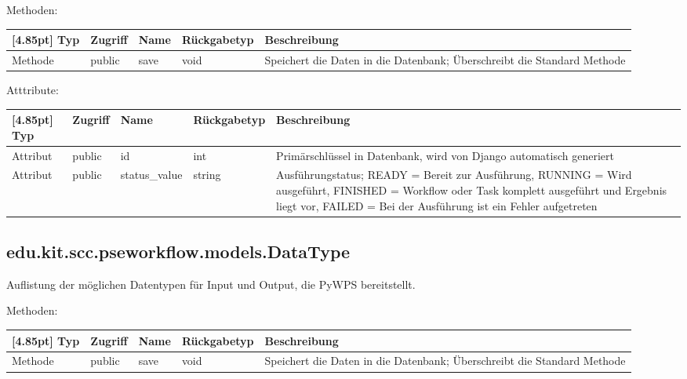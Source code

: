 			Methoden:
			\begin{center}
				\setlength\tabcolsep{5pt}
				\renewcommand{\arraystretch}{1.5}
				
				\begin{tabularx}{\textwidth}{|l|l|l|l|X|}
					\hline
					\rowcolor[gray]{0.75}[4.85pt]
					Typ & Zugriff & Name & Rückgabetyp & Beschreibung \\ \hline 
					Methode & public & save & void & Speichert die Daten in die Datenbank; Überschreibt die Standard Methode \\ 
					\hline
				\end{tabularx}
			\end{center}
			
			Atttribute:
			\begin{center}
				\setlength\tabcolsep{5pt}
				\renewcommand{\arraystretch}{1.5}
				
				\begin{tabularx}{\textwidth}{|l|l|l|l|X|}
					\hline
					\rowcolor[gray]{0.75}[4.85pt]
					Typ & Zugriff & Name & Rückgabetyp & Beschreibung \\ \hline 
	           		Attribut & public & id & int & Primärschlüssel in Datenbank, wird von Django automatisch generiert \\ \hline
	           		Attribut & public & status\_value & string & Ausführungstatus; READY = Bereit zur Ausführung, RUNNING = Wird ausgeführt, FINISHED = Workflow oder Task komplett ausgeführt und Ergebnis liegt vor, FAILED = Bei der Ausführung ist ein Fehler aufgetreten \\
	           		\hline
				\end{tabularx}
			\end{center}

		\subsection{edu.kit.scc.pseworkflow.models.DataType}
			Auflistung der möglichen Datentypen für Input und Output, die PyWPS bereitstellt.
			
			Methoden:
			\begin{center}
				\setlength\tabcolsep{5pt}
				\renewcommand{\arraystretch}{1.5}
				
				\begin{tabularx}{\textwidth}{|l|l|l|l|X|}
					\hline
					\rowcolor[gray]{0.75}[4.85pt]
					Typ & Zugriff & Name & Rückgabetyp & Beschreibung \\ \hline 
					Methode & public & save & void & Speichert die Daten in die Datenbank; Überschreibt die Standard Methode \\ 
					\hline
				\end{tabularx}
			\end{center}
			
